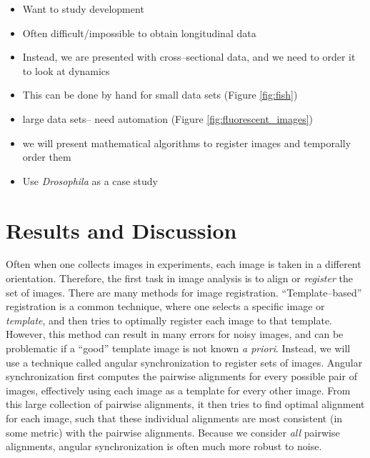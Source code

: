 \documentclass{pnastwo}
\begin{document}
\begin{article}
\begin{itemize}
\item Want to study development
\item Often difficult/impossible to obtain longitudinal data
\item Instead, we are presented with cross--sectional data, and we need to order it to look at dynamics
\item This can be done by hand for small data sets (Figure \ref{fig:fish})
\item large data sets-- need automation (Figure \ref{fig:fluorescent_images})
\item we will present mathematical algorithms to register images and temporally order them
\item Use {\em Drosophila} as a case study
\end{itemize}

\section{Results and Discussion}

Often when one collects images in experiments, each image is taken in a different orientation. 
%
Therefore, the first task in image analysis is to align or {\em register} the set of images. 
%
There are many methods for image registration. 
%
``Template--based'' registration \cite{ahuja2007template} is a common technique, where one selects a specific image or {\em template}, and then tries to optimally register each image to that template.
%
However, this method can result in many errors for noisy images, and can be problematic if a ``good'' template image is not known {\em a priori}. 
%
Instead, we will use a technique called angular synchronization\cite{singer2011angular} to register sets of images.
%
Angular synchronization first computes the pairwise alignments for every possible pair of images, effectively using each image as a template for every other image.
%
From this large collection of pairwise alignments, it then tries to find optimal alignment for each image, such that these individual alignments are most consistent (in some metric) with the pairwise alignments.
%
Because we consider {\em all} pairwise alignments, angular synchronization is often much more robust to noise. 


\end{article}
\end{document}
